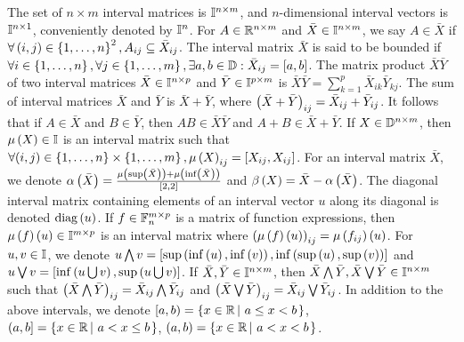 The set of $n\times m$ interval matrices is $\mathbb{I}^{n\times m}$,
and $n$-dimensional interval vectors is $\mathbb{I}^{n\times 1}$,
conveniently denoted by $\mathbb{I}^{n}$.  For $A\in\mathbb{R}^{n\times
  m}$ and $\bar{X}\in\mathbb{I}^{n\times m}$, we say $A\in \bar{X}$ if
$\forall \left(i,j\right)\in\left\{1,\ldots,n\right\}^2, A_{ij}\subseteq \bar{X}_{ij}$.
The interval matrix $\bar{X}$ is said to be bounded if $\forall
i\in\left\{1,\ldots,n\right\}, \forall j\in\left\{1,\ldots,m\right\}, \exists
a,b\in\mathbb{D}: \bar{X}_{ij} = [a,b]$.  The matrix product
$\bar{X}\bar{Y}$ of two interval matrices
$\bar{X}\in\mathbb{I}^{n\times p}$ and $\bar{Y}\in\mathbb{I}^{p\times
  m}$ is $\bar{X}\bar{Y} = \sum_{k=1}^p\bar{X}_{ik}\bar{Y}_{kj}$. The
sum of interval matrices $\bar{X}$ and $\bar{Y}$ is $\bar{X} +
\bar{Y}$, where $\left(\bar{X}+\bar{Y}\right)_{ij} = \bar{X}_{ij} +
\bar{Y}_{ij}$.  It follows that if $A\in \bar{X}$ and $B\in \bar{Y}$,
then $AB\in \bar{X}\bar{Y}$ and $A+B\in \bar{X}+\bar{Y}$.  If
$X\in\mathbb{D}^{n\times m}$, then $\mu\left(X\right)\in\mathbb{I}$ is an
interval matrix such that $\forall
(i,j)\in\left\{1,\ldots,n\right\}\times\left\{1,\ldots,m\right\}, \mu\left(X\right)_{ij} =
[X_{ij},X_{ij}]$.  For an interval matrix $\bar{X}$, we denote
$\alpha\left(\bar{X}\right) = \frac{\mu\left(\sup\left(\bar{X}\right)\right) +
  \mu\left(\inf\left(\bar{X}\right)\right)}{[2,2]}$ and $\beta\left(X\right) = \bar{X} -
\alpha\left(\bar{X}\right)$.  The diagonal interval matrix containing elements of an
interval vector $u$ along its diagonal is denoted $\operatorname{diag}\left(u\right)$.  If
$f\in\mathbb{F}_{n}^{m\times p}$ is a matrix of function expressions, then
$\mu\left(f\right)\left(u\right)\in \mathbb{I}^{m\times p}$ is an interval matrix where
$\left(\mu\left(f\right)\left(u\right)\right)_{ij} = \mu\left(f_{ij}\right)\left(u\right)$.  For $u,v\in\mathbb{I}$, we
denote $u\bigwedge v =
[\sup\left(\inf\left(u\right),\inf\left(v\right)\right),\inf\left(\sup\left(u\right),\sup\left(v\right)\right)]$ and
$u\bigvee v = [\inf\left(u\bigcup v\right), \sup\left(u\bigcup v\right)]$.  If
$\bar{X},\bar{Y}\in\mathbb{I}^{n\times m}$, then
$\bar{X}\bigwedge \bar{Y},\bar{X}\bigvee \bar{Y}\in\mathbb{I}^{n\times
  m}$ such that $\left(\bar{X}\bigwedge \bar{Y}\right)_{ij} =
\bar{X}_{ij}\bigwedge \bar{Y}_{ij}$ and
$\left(\bar{X}\bigvee \bar{Y}\right)_{ij} =
\bar{X}_{ij}\bigvee \bar{Y}_{ij}$.
%
In addition to the above intervals, we denote
%
$[a,b) = \left\{x\in\mathbb{R}\left|~a\leq x<b\right.\right\}$, $(a,b] = \left\{x\in\mathbb{R}\left|~a< x\leq b\right.\right\}$, $(a,b) = \left\{x\in\mathbb{R}\left|~a< x < b\right.\right\}$.

